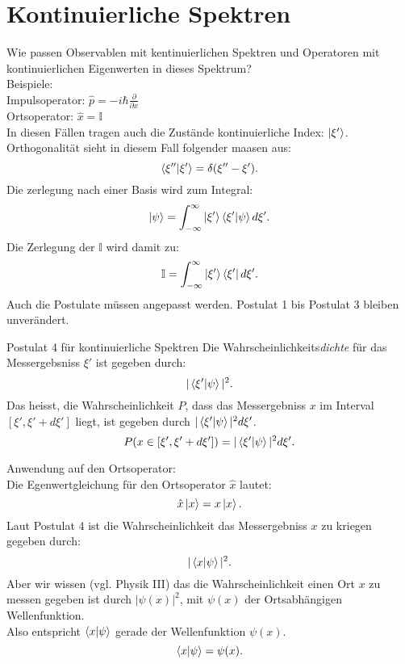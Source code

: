 \documentclass{report}
\begin{document}
\section{Kontinuierliche Spektren}
Wie passen Observablen mit kentinuierlichen Spektren und Operatoren mit kontinuierlichen Eigenwerten in dieses Spektrum? \\
Beispiele: \\
Impulsoperator: $\hat{p} = -i \hbar \frac{\partial}{\partial x} $ \\
Ortsoperator: $\hat{x} = \mathbb{I}$ \\
In diesen Fällen tragen auch die Zustände kontinuierliche Index: $\ket{\xi'}$.
Orthogonalität sieht in diesem Fall folgender maasen aus: \[
	\bra{\xi''} \ket{\xi'} = \delta(\xi'' - \xi')
.\] Die zerlegung nach einer Basis wird zum Integral: \[
\ket{\psi} =  \int_{-\infty}^{\infty} \ket{\xi'}\bra{\xi'} \ket{\psi} d\xi'  
.\] 
Die Zerlegung der $\mathbb{I}$ wird damit zu:  \[
	\mathbb{I} = \int_{-\infty}^{\infty} \ket{\xi'}\bra{\xi'} d\xi'  
.\] 
Auch die Postulate müssen angepasst werden. Postulat 1 bis Postulat 3 bleiben unverändert. \\
\begin{redbox}{Postulat 4 für kontinuierliche Spektren}
	Die Wahrscheinlichkeits\emph{dichte} für das Messergebsniss $\xi'$ ist gegeben durch: \[
	|\bra{\xi'} \ket{\psi}|^2 
.\] Das heisst, die Wahrscheinlichkeit $P$, dass das Messergebniss $x$ im Interval $[\xi', \xi' + d\xi']$ liegt, ist gegeben durch $|\bra{\xi'} \ket{\psi}|^2d\xi' $. \[
P(x \in [\xi', \xi' + d\xi']) =  | \bra{\xi'} \ket{\psi}|^2 d\xi'  
.\] 
\end{redbox}
Anwendung auf den Ortsoperator: \\
Die Egenwertgleichung für den Ortsoperator $\hat{x}$ lautet: \[
\hat{x}\ket{x} = x \ket{x} 
.\] Laut Postulat 4 ist die Wahrscheinlichkeit das Messergebniss $x$ zu kriegen gegeben durch: \[
| \bra{x} \ket{\psi}|^2 
.\] Aber wir wissen (vgl. Physik III) das die Wahrscheinlichkeit einen Ort  $x$ zu messen gegeben ist durch $|\psi(x)|^2$, mit $\psi(x)$ der Ortsabhängigen Wellenfunktion. \\
Also entspricht $\bra{x} \ket{\psi} $ gerade der Wellenfunktion $\psi(x)$. \[
	\bra{x}  \ket{\psi} = \psi(x) 
.\] \\
\end{document}
